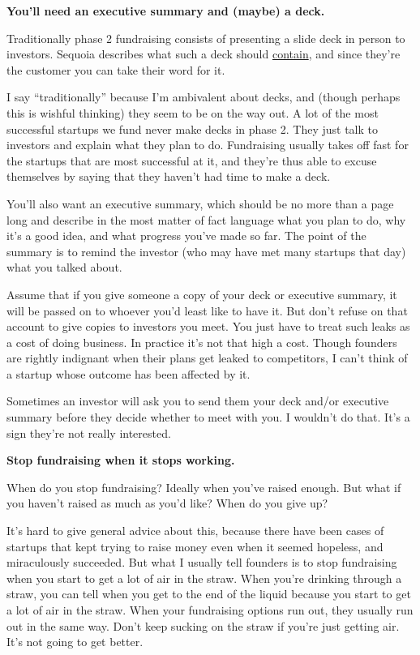 \textbf{You'll need an executive summary and (maybe) a deck.}

Traditionally phase 2 fundraising consists of presenting a slide deck in
person to investors. Sequoia describes what such a deck should
\href{http://www.sequoiacap.com/ideas}{contain}, and since they're the
customer you can take their word for it.

I say ``traditionally'' because I'm ambivalent about decks, and (though
perhaps this is wishful thinking) they seem to be on the way out. A lot
of the most successful startups we fund never make decks in phase 2.
They just talk to investors and explain what they plan to do.
Fundraising usually takes off fast for the startups that are most
successful at it, and they're thus able to excuse themselves by saying
that they haven't had time to make a deck.

You'll also want an executive summary, which should be no more than a
page long and describe in the most matter of fact language what you plan
to do, why it's a good idea, and what progress you've made so far. The
point of the summary is to remind the investor (who may have met many
startups that day) what you talked about.

Assume that if you give someone a copy of your deck or executive
summary, it will be passed on to whoever you'd least like to have it.
But don't refuse on that account to give copies to investors you meet.
You just have to treat such leaks as a cost of doing business. In
practice it's not that high a cost. Though founders are rightly
indignant when their plans get leaked to competitors, I can't think of a
startup whose outcome has been affected by it.

Sometimes an investor will ask you to send them your deck and/or
executive summary before they decide whether to meet with you. I
wouldn't do that. It's a sign they're not really interested.

\textbf{Stop fundraising when it stops working.}

When do you stop fundraising? Ideally when you've raised enough. But
what if you haven't raised as much as you'd like? When do you give up?

It's hard to give general advice about this, because there have been
cases of startups that kept trying to raise money even when it seemed
hopeless, and miraculously succeeded. But what I usually tell founders
is to stop fundraising when you start to get a lot of air in the straw.
When you're drinking through a straw, you can tell when you get to the
end of the liquid because you start to get a lot of air in the straw.
When your fundraising options run out, they usually run out in the same
way. Don't keep sucking on the straw if you're just getting air. It's
not going to get better.

